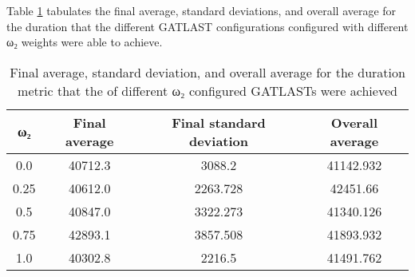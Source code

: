 Table \ref{tab:HP:GA:MWeight:duration} tabulates the final average, standard deviations, and overall average for the duration that the different GATLAST configurations configured with different ω₂ weights were able to achieve.
\begin{table}[tbh!]
\centering
\begin{adjustbox}{trim=0cm 0cm 0cm 0cm, clip=true}
\begin{tabular}{|c|c|c|c|}
\hline
ω₂ & Final average & Final standard deviation & Overall average\\
\hline
0.0 & 40712.3 & 3088.2 & 41142.932\\\hline
0.25 & 40612.0 & 2263.728 & 42451.66\\\hline
0.5 & 40847.0 & 3322.273 & 41340.126\\\hline
0.75 & 42893.1 & 3857.508 & 41893.932\\\hline
1.0 & 40302.8 & 2216.5 & 41491.762\\\hline
\end{tabular}
\end{adjustbox}
\caption{Final average, standard deviation, and overall average for the duration metric that the of different ω₂ configured GATLASTs were achieved}
\label{tab:HP:GA:MWeight:duration}
\end{table}